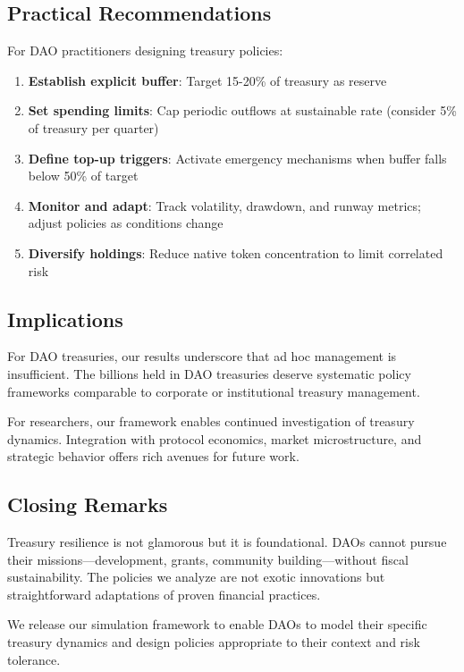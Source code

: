 \subsection{Practical Recommendations}

For DAO practitioners designing treasury policies:

\begin{enumerate}
    \item \textbf{Establish explicit buffer}: Target 15-20\% of treasury as reserve
    \item \textbf{Set spending limits}: Cap periodic outflows at sustainable rate (consider 5\% of treasury per quarter)
    \item \textbf{Define top-up triggers}: Activate emergency mechanisms when buffer falls below 50\% of target
    \item \textbf{Monitor and adapt}: Track volatility, drawdown, and runway metrics; adjust policies as conditions change
    \item \textbf{Diversify holdings}: Reduce native token concentration to limit correlated risk
\end{enumerate}

\subsection{Implications}

For DAO treasuries, our results underscore that ad hoc management is insufficient. The billions held in DAO treasuries deserve systematic policy frameworks comparable to corporate or institutional treasury management.

For researchers, our framework enables continued investigation of treasury dynamics. Integration with protocol economics, market microstructure, and strategic behavior offers rich avenues for future work.

\subsection{Closing Remarks}

Treasury resilience is not glamorous but it is foundational. DAOs cannot pursue their missions---development, grants, community building---without fiscal sustainability. The policies we analyze are not exotic innovations but straightforward adaptations of proven financial practices.

We release our simulation framework to enable DAOs to model their specific treasury dynamics and design policies appropriate to their context and risk tolerance.
